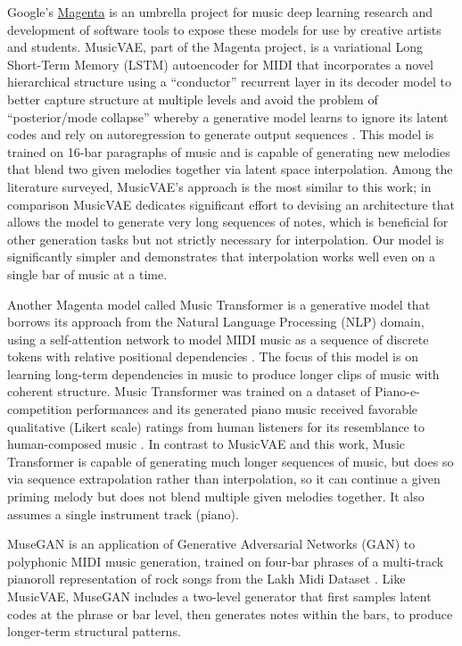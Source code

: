 \documentclass[sigconf,authorversion]{acmart}
\begin{document}
Google's \href{https://magenta.tensorflow.org/}{Magenta} is an
umbrella project for music deep learning research and development of
software tools to expose these models for use by creative artists and
students. MusicVAE, part of the Magenta project, is a variational Long
Short-Term Memory (LSTM) autoencoder for MIDI that incorporates a
novel hierarchical structure using a ``conductor'' recurrent layer in
its decoder model to better capture structure at multiple levels and
avoid the problem of ``posterior/mode collapse'' whereby a generative
model learns to ignore its latent codes and rely on autoregression to
generate output sequences \cite{roberts_hierarchical_2018}. This model
is trained on 16-bar paragraphs of music and is capable of generating
new melodies that blend two given melodies together via latent space
interpolation. Among the literature surveyed, MusicVAE's approach is
the most similar to this work; in comparison MusicVAE dedicates
significant effort to devising an architecture that allows the model
to generate very long sequences of notes, which is beneficial for
other generation tasks but not strictly necessary for
interpolation. Our model is significantly simpler and demonstrates
that interpolation works well even on a single bar of music at a time.

Another Magenta model called Music Transformer is a generative model
that borrows its approach from the Natural Language Processing (NLP)
domain, using a self-attention network to model MIDI music as a
sequence of discrete tokens with relative positional dependencies
\cite{huang_music_2018}. The focus of this model is on learning
long-term dependencies in music to produce longer clips of music with
coherent structure. Music Transformer was trained on a dataset of
Piano-e-competition performances \cite{hawthorne2019enabling} and its
generated piano music received favorable qualitative (Likert scale)
ratings from human listeners for its resemblance to human-composed
music \cite{huang_music_2018}. In contrast to MusicVAE and this work,
Music Transformer is capable of generating much longer sequences of
music, but does so via sequence extrapolation rather than
interpolation, so it can continue a given priming melody but does not
blend multiple given melodies together. It also assumes a single
instrument track (piano).

MuseGAN \cite{dong2017musegan} is an application of Generative
Adversarial Networks (GAN) to polyphonic MIDI music generation,
trained on four-bar phrases of a multi-track pianoroll representation
of rock songs from the Lakh Midi Dataset
\cite{raffel_learning-based_2016}. Like MusicVAE, MuseGAN includes a
two-level generator that first samples latent codes at the phrase or
bar level, then generates notes within the bars, to produce
longer-term structural patterns.
\end{document}
